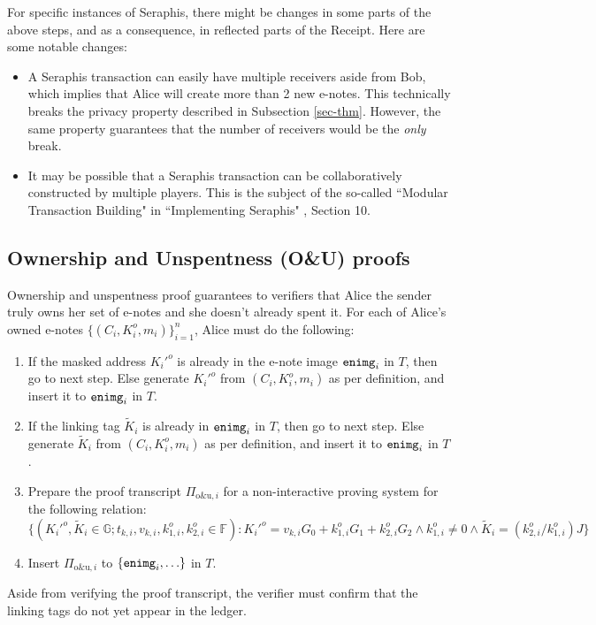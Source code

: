 \documentclass{article}
\theoremstyle{plain}
\theoremstyle{remark}
\begin{document}
For specific instances of Seraphis, there might be changes in some parts of the above steps, and as a consequence, in reflected parts of the Receipt. Here are some notable changes:
\begin{itemize}
\item A Seraphis transaction can easily have multiple receivers aside from Bob, which implies that Alice will create more than 2 new e-notes. This technically breaks the privacy property described in Subsection \ref{sec-thm}. However, the same property guarantees that the number of receivers would be the \textit{only} break.
\item It may be possible that a Seraphis transaction can be collaboratively constructed by multiple players. This is the subject of the so-called ``Modular Transaction Building" in ``Implementing Seraphis" \cite{seraphis}, Section 10.
\end{itemize}

\subsection{Ownership and Unspentness (O\&U) proofs}\label{own-unsp}
Ownership and unspentness proof guarantees to verifiers that Alice the sender truly owns her set of e-notes and she doesn't already spent it. For each of Alice's owned e-notes $\{(C_i,K_i^o,m_i)\}_{i=1}^n$, Alice must do the following:
\begin{enumerate}
    \item If the masked address $K_i'^o$ is already in the e-note image ${\tt enimg}_i$ in $T$, then go to next step. Else generate $K_i'^o$ from $(C_i, K_i^o, m_i)$ as per definition, and insert it to ${\tt enimg}_i$ in $T$.
    \item If the linking tag $\tilde{K}_i$ is already in ${\tt enimg}_i$ in $T$, then go to next step. Else generate $\tilde{K}_i$ from $(C_i, K_i^o, m_i)$ as per definition, and insert it to ${\tt enimg}_i$ in $T$.
    \item Prepare the proof transcript $\Pi_{\text{o\&u}, i}$ for a non-interactive proving system for the following relation:
$$\{(K_i'^o, \tilde{K}_i\in\mathbb{G}; t_{k,i}, v_{k,i}, k_{1,i}^o, k_{2,i}^o\in\mathbb{F}): K_i'^o = v_{k,i} G_0 + k_{1,i}^o G_1 + k_{2,i}^o G_2 \wedge k_{1,i}^o \ne 0 \wedge \tilde{K}_i = (k_{2,i}^o/k_{1,i}^o)J \}$$
    \item Insert $\Pi_{\text{o\&u}, i}$ to $\{{\tt enimg}_i, \ldots\}$ in $T$.
\end{enumerate}
Aside from verifying the proof transcript, the verifier must confirm that the linking tags do not yet appear in the ledger.
\end{document}
